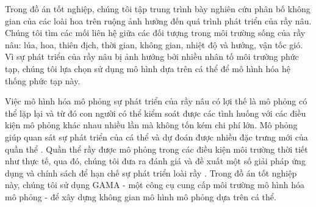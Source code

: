 \documentclass[13pt]{extreport}
\begin{document}
Trong đồ án tốt nghiệp, chúng tôi tập trung trình bày nghiên cứu phân bố không gian của các loài hoa trên ruộng ảnh hưởng đến quá trình phát triển của rầy nâu. Chúng tôi tìm các mối liên hệ giữa các đối tượng trong môi trường sống của rầy nâu: lúa, hoa, thiên địch, thời gian, không gian, nhiệt độ và hướng, vận tốc gió. Vì sự phát triển của rầy nâu bị ảnh hưởng bởi nhiều nhân tố môi trường phức tạp, chúng tôi lựa chọn sử dụng mô hình dựa trên cá thể để mô hình hóa hệ thống phức tạp này. 

Việc mô hình hóa mô phỏng sự phát triển của rầy nâu có lợi thế là mô phỏng có thể lặp lại và từ đó con người có thể kiểm soát được các tình huống với các điều kiện mô phỏng khác nhau nhiều lần mà không tốn kém chi phí lớn. Mô phỏng giúp quan sát sự phát triển của cá thể và dự đoán được nhiều đặc trưng mới của quần thể \cite{tltk12}. Quần thể rầy được mô phỏng trong các điều kiện môi trường thời tiết như thực tế, qua đó, chúng tôi đưa ra đánh giá và đề xuất một số giải pháp ứng dụng và chính sách để hạn chế sự phát triển loài rầy \cite{tltk13}. Trong đồ án tốt nghiệp này, chúng tôi sử dụng GAMA - một công cụ cung cấp môi trường mô hình hóa mô phỏng - để xây dựng không gian mô hình mô phỏng dựa trên cá thể.
\end{document}
